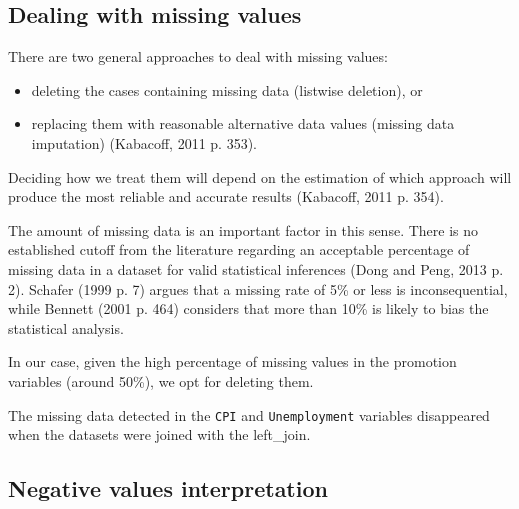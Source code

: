 \documentclass[11pt,]{article}
\newenvironment{Shaded}{\begin{snugshade}}{\end{snugshade}}
\newcommand{\StringTok}[1]{\textcolor[rgb]{0.31,0.60,0.02}{{#1}}}
\newcommand{\CommentTok}[1]{\textcolor[rgb]{0.56,0.35,0.01}{\textit{{#1}}}}
\newcommand{\OtherTok}[1]{\textcolor[rgb]{0.56,0.35,0.01}{{#1}}}
\newcommand{\NormalTok}[1]{{#1}}
\begin{document}
\subsection{Dealing with missing
values}\label{dealing-with-missing-values}

There are two general approaches to deal with missing values:

\begin{itemize}
\item
  deleting the cases containing missing data (listwise deletion), or
\item
  replacing them with reasonable alternative data values (missing data
  imputation) (Kabacoff, 2011 p. 353).
\end{itemize}

Deciding how we treat them will depend on the estimation of which
approach will produce the most reliable and accurate results (Kabacoff,
2011 p. 354).

The amount of missing data is an important factor in this sense. There
is no established cutoff from the literature regarding an acceptable
percentage of missing data in a dataset for valid statistical inferences
(Dong and Peng, 2013 p. 2). Schafer (1999 p. 7) argues that a missing
rate of 5\% or less is inconsequential, while Bennett (2001 p. 464)
considers that more than 10\% is likely to bias the statistical
analysis.

In our case, given the high percentage of missing values in the
promotion variables (around 50\%), we opt for deleting them.

The missing data detected in the \texttt{CPI} and \texttt{Unemployment}
variables disappeared when the datasets were joined with the left\_join.

\pagebreak

\begin{Shaded}
\end{Shaded}

\subsection{Negative values
interpretation}\label{negative-values-interpretation}
\end{document}
